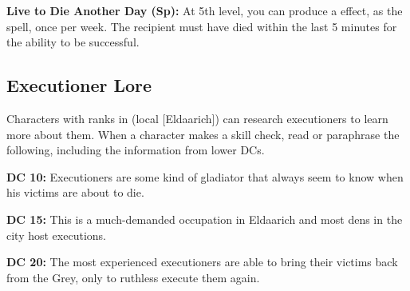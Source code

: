 \textbf{Live to Die Another Day (Sp):} At 5th level, you can produce a  effect, as the spell, once per week. The recipient must have died within the last 5 minutes for the ability to be successful.

\subsection{Executioner Lore}
Characters with ranks in  (local [Eldaarich]) can research executioners to learn more about them. When a character makes a skill check, read or paraphrase the following, including the information from lower DCs.

\textbf{DC 10:} Executioners are some kind of gladiator that always seem to know when his victims are about to die.

\textbf{DC 15:} This is a much-demanded occupation in Eldaarich and most dens in the city host executions.

\textbf{DC 20:} The most experienced executioners are able to bring their victims back from the Grey, only to ruthless execute them again.